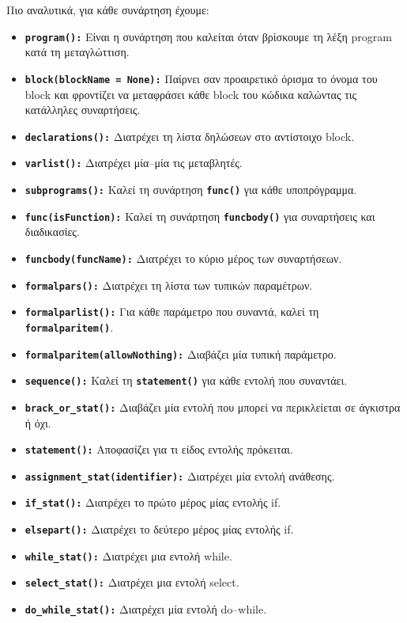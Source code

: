 \documentclass[a4paper]{article}
\let\OldTexttt\texttt
\renewcommand{\texttt}[1]{\OldTexttt{\textbf{#1}}}
\begin{document}
Πιο αναλυτικά, για κάθε συνάρτηση έχουμε:
\begin{itemize}
    \item \texttt{program():} Είναι η συνάρτηση που καλείται όταν βρίσκουμε
        τη λέξη program κατά τη μεταγλώττιση.
    \item \texttt{block(blockName = None):} Παίρνει σαν προαιρετικό όρισμα
        το όνομα του block και φροντίζει να μεταφράσει κάθε block του
        κώδικα καλώντας τις κατάλληλες συναρτήσεις.
    \item \texttt{declarations():} Διατρέχει τη λίστα δηλώσεων στο
        αντίστοιχο block.
    \item \texttt{varlist():} Διατρέχει μία--μία τις μεταβλητές.
    \item \texttt{subprograms():} Καλεί τη συνάρτηση \texttt{func()} για
        κάθε υποπρόγραμμα.
    \item \texttt{func(isFunction):} Καλεί τη συνάρτηση \texttt{funcbody()}
        για συναρτήσεις και διαδικασίες.
    \item \texttt{funcbody(funcName):} Διατρέχει το κύριο μέρος των
        συναρτήσεων.
    \item \texttt{formalpars():} Διατρέχει τη λίστα των τυπικών παραμέτρων.
    \item \texttt{formalparlist():} Για κάθε παράμετρο που συναντά, καλεί
        τη \texttt{formalparitem()}.
    \item \texttt{formalparitem(allowNothing):} Διαβάζει μία τυπική παράμετρο.
    \item \texttt{sequence():} Καλεί τη \texttt{statement()} για κάθε
        εντολή που συναντάει.
    \item \texttt{brack\_or\_stat():} Διαβάζει μία εντολή που μπορεί να
        περικλείεται σε άγκιστρα ή όχι.
    \item \texttt{statement():} Αποφασίζει για τι είδος εντολής πρόκειται.
    \item \texttt{assignment\_stat(identifier):} Διατρέχει μία εντολή
        ανάθεσης.
    \item \texttt{if\_stat():} Διατρέχει το πρώτο μέρος μίας εντολής if.
    \item \texttt{elsepart():} Διατρέχει το δεύτερο μέρος μίας εντολής if.
    \item \texttt{while\_stat():} Διατρέχει μια εντολή while.
    \item \texttt{select\_stat():} Διατρέχει μια εντολή select.
    \item \texttt{do\_while\_stat():} Διατρέχει μία εντολή do--while.

\end{itemize}
\end{document}
